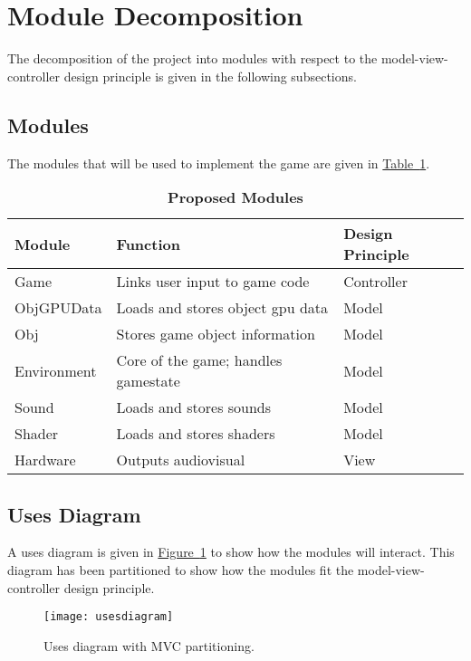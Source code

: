 \documentclass[12pt, titlepage]{article}
\begin{document}
\section{Module Decomposition}
The decomposition of the project into modules with respect to the model-view-controller design principle is given in the following subsections.

\subsection{Modules}
The modules that will be used to implement the game are given in \hyperref[tab:modules]{Table~\ref*{tab:modules}}.  

\begin{table}[h]
\caption{\bf Proposed Modules} \label{tab:modules}
\begin{tabularx}{\textwidth}{p{3cm}p{6cm}X}
\toprule {\bf Module} & {\bf Function} & {\bf Design Principle}\\
\midrule
Game & Links user input to game code & Controller\\
ObjGPUData & Loads and stores object gpu data & Model\\
Obj & Stores game object information & Model\\
Environment & Core of the game; handles gamestate & Model\\
Sound & Loads and stores sounds & Model\\
Shader & Loads and stores shaders & Model\\
Hardware & Outputs audiovisual & View\\
\bottomrule
\end{tabularx}
\end{table}


\subsection{Uses Diagram}
A uses diagram is given in \hyperref[fig:usesdiagram]{Figure~\ref*{fig:usesdiagram}} to show how the modules will interact.  This diagram has been partitioned to show how the modules fit the model-view-controller design principle.
\begin{figure}[hTB]
\begin{center}
\texttt{[image: usesdiagram]}
\caption{Uses diagram with MVC partitioning.} \label{fig:usesdiagram}
\end{center}
\end{figure}
\end{document}
